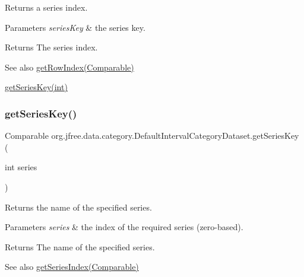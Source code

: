 Returns a series index.


\begin{DoxyParams}{Parameters}
{\em series\+Key} & the series key.\\
\hline
\end{DoxyParams}
\begin{DoxyReturn}{Returns}
The series index.
\end{DoxyReturn}
\begin{DoxySeeAlso}{See also}
\mbox{\hyperlink{classorg_1_1jfree_1_1data_1_1category_1_1_default_interval_category_dataset_afba38bccf1dff83c9346fec2dad6aa69}{get\+Row\+Index(\+Comparable)}} 

\mbox{\hyperlink{classorg_1_1jfree_1_1data_1_1category_1_1_default_interval_category_dataset_a1004c0e577d9e3b1edc6651bf97fd45a}{get\+Series\+Key(int)}} 
\end{DoxySeeAlso}
\mbox{\label{classorg_1_1jfree_1_1data_1_1category_1_1_default_interval_category_dataset_a1004c0e577d9e3b1edc6651bf97fd45a}} 
\subsubsection{\texorpdfstring{get\+Series\+Key()}{getSeriesKey()}}
{\footnotesize\ttfamily Comparable org.\+jfree.\+data.\+category.\+Default\+Interval\+Category\+Dataset.\+get\+Series\+Key (\begin{DoxyParamCaption}\item[{int}]{series }\end{DoxyParamCaption})}

Returns the name of the specified series.


\begin{DoxyParams}{Parameters}
{\em series} & the index of the required series (zero-\/based).\\
\hline
\end{DoxyParams}
\begin{DoxyReturn}{Returns}
The name of the specified series.
\end{DoxyReturn}
\begin{DoxySeeAlso}{See also}
\mbox{\hyperlink{classorg_1_1jfree_1_1data_1_1category_1_1_default_interval_category_dataset_a11d3a851909daca3a6a279611a7151ba}{get\+Series\+Index(\+Comparable)}} 
\end{DoxySeeAlso}


